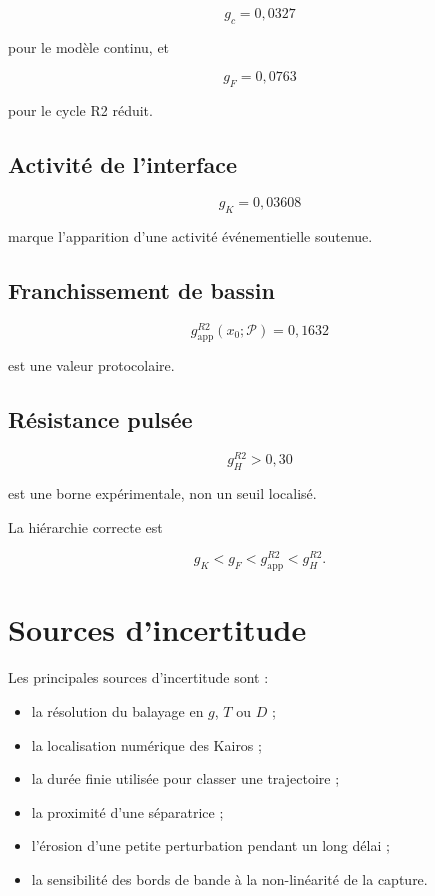 \[
g_c=0{,}0327
\]

pour le modèle continu, et

\[
g_F=0{,}0763
\]

pour le cycle R2 réduit.

\subsection{Activité de l'interface}

\[
g_K=0{,}03608
\]

marque l'apparition d'une activité événementielle soutenue.

\subsection{Franchissement de bassin}

\[
g_{\mathrm{app}}^{R2}(x_0;\mathcal P)=0{,}1632
\]

est une valeur protocolaire.

\subsection{Résistance pulsée}

\[
g_H^{R2}>0{,}30
\]

est une borne expérimentale, non un seuil localisé.

La hiérarchie correcte est

\[
\boxed{
g_K<g_F<g_{\mathrm{app}}^{R2}<g_H^{R2}.
}
\]

\section{Sources d'incertitude}
\label{annexe-num-incertitudes}

Les principales sources d'incertitude sont :

\begin{itemize}
\item la résolution du balayage en \(g\), \(T\) ou \(D\) ;
\item la localisation numérique des Kairos ;
\item la durée finie utilisée pour classer une trajectoire ;
\item la proximité d'une séparatrice ;
\item l'érosion d'une petite perturbation pendant un long délai ;
\item la sensibilité des bords de bande à la non-linéarité de la capture.
\end{itemize}


